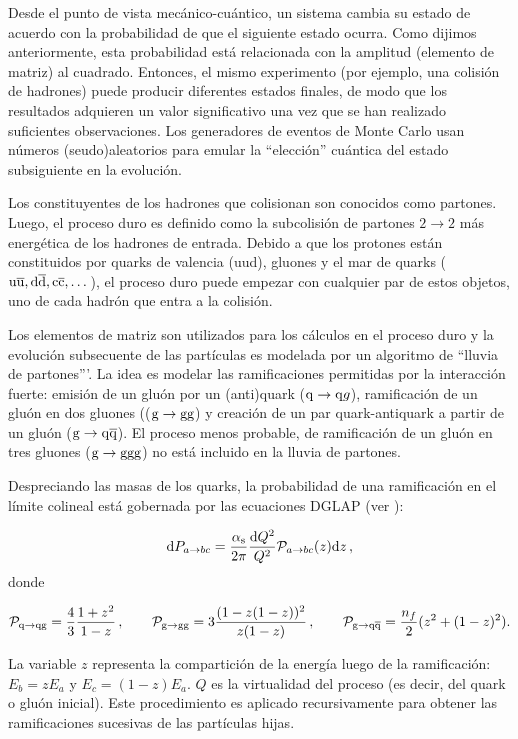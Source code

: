 \documentclass[a4paper,12pt]{article}
\begin{document}
Desde el punto de vista mecánico-cuántico, un sistema cambia su estado de acuerdo con la probabilidad de que el siguiente estado ocurra. Como dijimos anteriormente, esta probabilidad está relacionada con la amplitud (elemento de matriz) al cuadrado. Entonces, el mismo experimento (por ejemplo, una colisión de hadrones) puede producir diferentes estados finales, de modo que los resultados adquieren un valor significativo una vez que se han realizado suficientes observaciones. Los generadores de eventos de Monte Carlo usan números (seudo)aleatorios para emular la ``elección'' cuántica del estado subsiguiente en la evolución.

Los constituyentes de los hadrones que colisionan son conocidos como partones. Luego, el proceso duro es definido como la subcolisión de partones $2\to 2$ más energética de los hadrones de entrada. Debido a que los protones están constituidos por quarks de valencia (uud), gluones y el mar de quarks (${\mathrm u}\overline{\mathrm u}, {\mathrm d}\overline{\mathrm d}, {\mathrm c}\overline{\mathrm c},\dots$), el proceso duro puede empezar con cualquier par de estos objetos, uno de cada hadrón que entra a la colisión.

Los elementos de matriz son utilizados para los cálculos en el proceso duro y la evolución subsecuente de las partículas es modelada por un algoritmo de ``lluvia de partones'''. La idea es modelar las ramificaciones permitidas por la interacción fuerte: emisión de un gluón por un (anti)quark (${\mathrm q}\to{\mathrm q} g$), ramificación de un gluón en dos gluones ((${\mathrm g}\to{\mathrm g}{\mathrm g}$) y creación de un par quark-antiquark a partir de un gluón (${\mathrm g}\to{\mathrm q}\overline{\mathrm q}$). El proceso menos probable, de ramificación de un gluón en tres gluones (${\mathrm g}\to{\mathrm g}{\mathrm g}{\mathrm g}$) no está incluido en la lluvia de partones.

Despreciando las masas de los quarks, la probabilidad de una ramificación en el límite
colineal está gobernada por las ecuaciones DGLAP (ver \cite{Sjostrand:2009ad}):

\begin{equation}
  {\mathrm d} P_{a\to bc} = \frac{\alpha_{\mathrm{s}}}{2\pi}\frac{{\mathrm d} Q^2}{Q^2}\mathcal{P}_{a\rightarrow bc}(z) {\mathrm d} z\label{eq:DGLAP}
  \, ,
\end{equation}
donde

$$
\mathcal{P}_{{\mathrm q}\to {\mathrm q}{\mathrm g}} = \frac43 \frac{1+z^2}{1-z}
  \, , \hspace{2em}
\mathcal{P}_{{\mathrm g}\to {\mathrm g}{\mathrm g}} = 3 \frac{(1-z(1-z))^2}{z(1-z)}
  \, , \hspace{2em}
\mathcal{P}_{{\mathrm g}\to {\mathrm q}\overline{\mathrm q}} = \frac{n_f}2 (z^2+(1-z)^2).
$$

La variable $z$ representa la compartición de la energía luego de la ramificación: $E_b=zE_a$ y $E_c=(1-z)E_a$. $Q$ es la virtualidad del proceso (es decir, del quark o gluón inicial). Este procedimiento es aplicado recursivamente para obtener las ramificaciones sucesivas de las partículas hijas.
\end{document}
